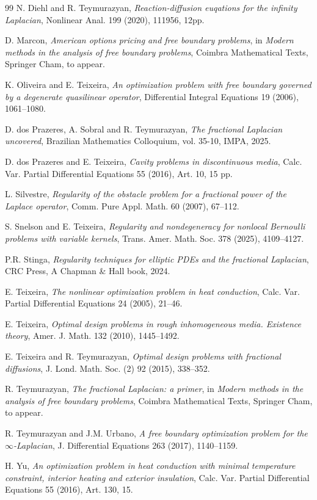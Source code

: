 \documentclass[11pt, reqno]{amsart}
\numberwithin{equation}{section}
\numberwithin{theorem}{section}
\numberwithin{lemma}{section}
\numberwithin{corollary}{section}
\numberwithin{remark}{section}
\numberwithin{proposition}{section}
\numberwithin{definition}{section}
\begin{document}
\begin{thebibliography}{99}
 N. Diehl and R. Teymurazyan, \textit{Reaction-diffusion euqations for the infinity Laplacian}, Nonlinear Anal. 199 (2020), 111956, 12pp.

 D. Marcon, \textit{American options pricing and free boundary problems}, in \textit{Modern methods in the analysis of free boundary problems}, Coimbra Mathematical Texts, Springer Cham, to appear.

 K. Oliveira and E. Teixeira, \textit{An optimization problem with free boundary governed by a degenerate quasilinear operator}, Differential Integral Equations 19 (2006), 1061--1080.

 D. dos Prazeres, A. Sobral and R. Teymurazyan, \textit{The fractional Laplacian uncovered}, Brazilian Mathematics Colloquium, vol. 35-10, IMPA, 2025.

 D. dos Prazeres and E. Teixeira, \textit{Cavity problems in discontinuous media}, Calc. Var. Partial Differential Equations 55 (2016), Art. 10, 15 pp.

 L. Silvestre, \textit{Regularity of the obstacle problem for a fractional power of the Laplace operator}, Comm. Pure Appl. Math. 60 (2007), 67--112.

 S. Snelson and E. Teixeira, \textit{Regularity and nondegeneracy for nonlocal Bernoulli problems with variable kernels}, Trans. Amer. Math. Soc. 378 (2025), 4109--4127.

 P.R. Stinga, \textit{Regularity techniques for elliptic PDEs and the fractional Laplacian}, CRC Press, A Chapman \& Hall book, 2024.

 E. Teixeira, \textit{The nonlinear optimization problem in heat conduction}, Calc. Var. Partial Differential Equations 24 (2005), 21--46.

 E. Teixeira, \textit{Optimal design problems in rough inhomogeneous media. Existence theory}, Amer. J. Math. 132 (2010), 1445--1492.
	
 E. Teixeira and R. Teymurazyan, \textit{Optimal design problems with fractional diffusions}, J. Lond. Math. Soc. (2) 92 (2015), 338--352.

 R. Teymurazyan, \textit{The fractional Laplacian: a primer}, in \textit{Modern methods in the analysis of free boundary problems}, Coimbra Mathematical Texts, Springer Cham, to appear.

 R. Teymurazyan and J.M. Urbano, \textit{A free boundary optimization problem for the $\infty$-Laplacian}, J. Differential Equations 263 (2017), 1140--1159.

 H. Yu, \textit{An optimization problem in heat conduction with minimal temperature constraint, interior heating and exterior insulation}, Calc. Var. Partial Differential Equations 55 (2016), Art. 130, 15. 

\end{thebibliography}
\end{document}
